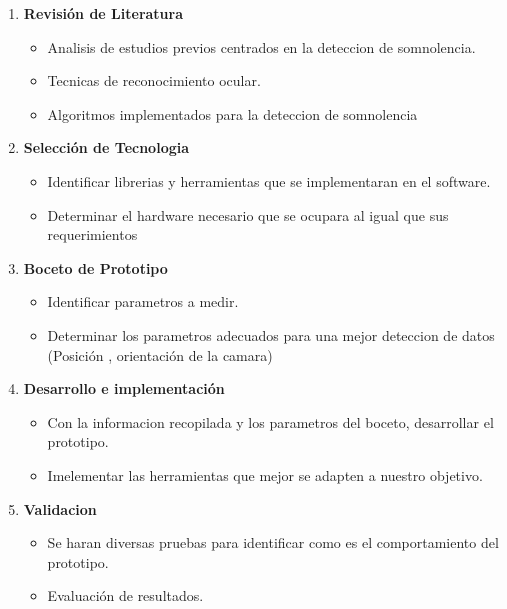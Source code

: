 \documentclass[letterpaper,12pt,oneside]{article}
\begin{document}
\begin{enumerate}
    \item \textbf{Revisión de Literatura}
    \begin{itemize}
        \item Analisis de estudios previos centrados en la deteccion de somnolencia.
        \item Tecnicas de reconocimiento ocular.
        \item Algoritmos implementados para la deteccion  de somnolencia
    \end{itemize}
    \item \textbf{Selección de Tecnologia}
    \begin{itemize}
        \item Identificar librerias y herramientas que se implementaran en el software.
        \item Determinar el hardware necesario que se ocupara al igual que sus requerimientos
    \end{itemize}
    \item \textbf{Boceto de Prototipo}
    \begin{itemize}
         \item Identificar parametros a medir.
        \item  Determinar los parametros adecuados para una mejor deteccion de datos (Posición , orientación de la camara)
        
    \end{itemize}
    \item \textbf{Desarrollo e implementación}
    \begin{itemize}
        \item Con la informacion recopilada y los parametros del boceto, desarrollar el prototipo.
        \item Imelementar las herramientas que mejor se adapten a nuestro objetivo.
        
    \end{itemize}
    \item \textbf{Validacion }
    \begin{itemize}
        \item Se haran diversas pruebas para identificar como es el comportamiento del prototipo.
        \item Evaluación de resultados.
    \end{itemize}
    
\end{enumerate}
\end{document}
